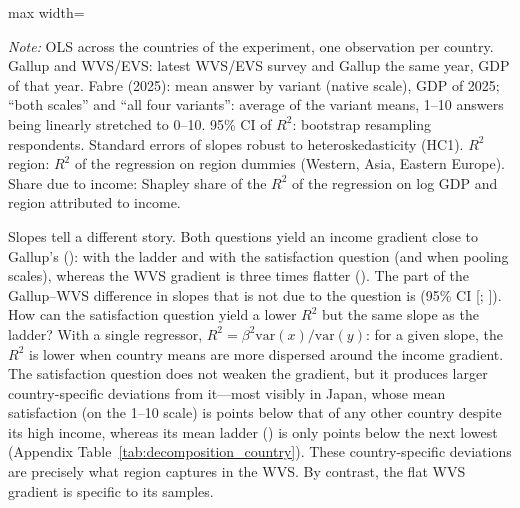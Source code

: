\documentclass[12pt]{article}
\begin{document}
\begin{table}[htbp]
    \centering
    \caption{Relation between GDP per capita and national well-being in the ten countries of the experiment: past vs.\ new data.}\label{tab:ten_countries}
    \begin{adjustbox}{max width=\textwidth}
    
    \end{adjustbox}
    \begin{minipage}{\textwidth}\footnotesize \textit{Note:} OLS across the \nDecompCountries countries of the experiment, one observation per country. Gallup and WVS/EVS: latest WVS/EVS survey and Gallup the same year, GDP of that year. Fabre (2025): mean answer by variant (native scale), GDP of 2025; ``both scales'' and ``all four variants'': average of the variant means, 1--10 answers being linearly stretched to 0--10. 95\% CI of $R^2$: bootstrap resampling respondents. Standard errors of slopes robust to heteroskedasticity (HC1). $R^2$ region: $R^2$ of the regression on region dummies (Western, Asia, Eastern Europe). Share due to income: Shapley share of the $R^2$ of the regression on log GDP and region attributed to income.\end{minipage}
\end{table}

Slopes tell a different story. Both questions yield an income gradient close to Gallup's (\slopeTenGallup): \slopeTenFabreLadder with the ladder and \slopeTenFabreSatisfaction with the satisfaction question (\slopeTenFabreLadderPooled and \slopeTenFabreSatisfactionPooled when pooling scales), whereas the WVS gradient is three times flatter (\slopeTenWVS). The part of the Gallup--WVS difference in slopes that is not due to the question is \SlopeDiffinDiff (95\% CI [\SlopeDiffinDiffLow; \SlopeDiffinDiffHigh]). How can the satisfaction question yield a lower $R^2$ but the same slope as the ladder? With a single regressor, $R^2 = \beta^2 \mathrm{var}(x)/\mathrm{var}(y)$: for a given slope, the $R^2$ is lower when country means are more dispersed around the income gradient. The satisfaction question does not weaken the gradient, but it produces larger country-specific deviations from it---most visibly in Japan, whose mean satisfaction (\meanSatisfactionJPN on the 1--10 scale) is \gapSatisfactionJPN points below that of any other country despite its high income, whereas its mean ladder (\meanLadderJPN) is only \gapLadderJPN points below the next lowest (Appendix Table~\ref{tab:decomposition_country}). These country-specific deviations are precisely what region captures in the WVS. By contrast, the flat WVS gradient is specific to its samples.
\end{document}
